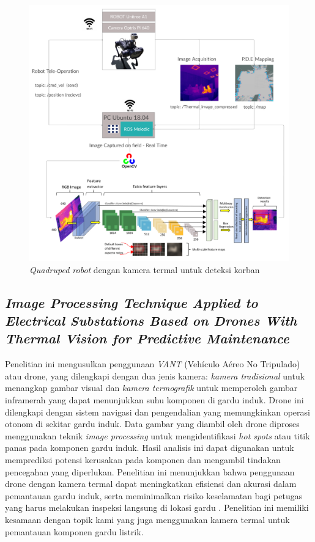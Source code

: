 \begin{figure} [H] \centering
  \includegraphics[scale=0.085]{gambar/unitreea1.png}
  \caption{\emph{Quadruped robot} dengan kamera termal untuk deteksi korban}
  \label{fig:Quadruped  dengan kamera termal untuk deteksi korban}
\end{figure}


\subsection{\emph{Image Processing Technique Applied to Electrical
Substations Based on Drones With Thermal Vision
for Predictive Maintenance}}
Penelitian ini mengusulkan penggunaan \emph{VANT} (Vehículo Aéreo No Tripulado) atau drone, yang dilengkapi dengan dua jenis kamera: \emph{kamera tradisional} untuk menangkap gambar visual dan \emph{kamera termografik} untuk memperoleh gambar inframerah yang dapat menunjukkan suhu komponen di gardu induk. Drone ini dilengkapi dengan sistem navigasi dan pengendalian yang memungkinkan operasi otonom di sekitar gardu induk. Data gambar yang diambil oleh drone diproses menggunakan teknik \emph{image processing} untuk mengidentifikasi \emph{hot spots} atau titik panas pada komponen gardu induk. Hasil analisis ini dapat digunakan untuk memprediksi potensi kerusakan pada komponen dan mengambil tindakan pencegahan yang diperlukan. Penelitian ini menunjukkan bahwa penggunaan drone dengan kamera termal dapat meningkatkan efisiensi dan akurasi dalam pemantauan gardu induk, serta meminimalkan risiko keselamatan bagi petugas yang harus melakukan inspeksi langsung di lokasi gardu \cite{Prieto2022}. Penelitian ini memiliki kesamaan dengan topik kami yang juga menggunakan kamera termal untuk pemantauan komponen gardu listrik.

